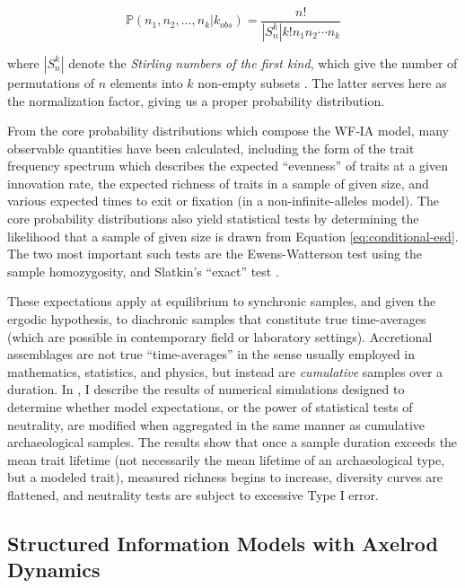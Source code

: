 \begin{equation}
\label{eq:conditional-esd}
\mathbb{P}(n_1, n_2, \ldots, n_k | k_{obs}) = \frac{n!}{|S^k_n| k! n_1 n_2 \cdots n_k}
\end{equation}

where $|S^k_n|$ denote the \emph{Stirling numbers of the first kind}, which give the number of permutations of $n$ elements into $k$ non-empty subsets \citep{abramowitz1965}.  The latter serves here as the normalization factor, giving us a proper probability distribution.   

From the core probability distributions which compose the WF-IA model, many observable quantities have been calculated, including the form of the trait frequency spectrum which describes the expected ``evenness'' of traits at a given innovation rate, the expected richness of traits in a sample of given size, and various expected times to exit or fixation (in a non-infinite-alleles model).  The core probability distributions also yield statistical tests by determining the likelihood that a sample of given size is drawn from Equation \ref{eq:conditional-esd}.  The two most important such tests  are the Ewens-Watterson test using the sample homozygosity, and Slatkin's ``exact'' test \citep{durrett2008,Ewens2004,slatkin1994exact,slatkin1996correction,slatkin1994exact,slatkin1996correction}.  

These expectations apply at equilibrium to synchronic samples, and given the ergodic hypothesis, to diachronic samples that constitute true time-averages (which are possible in contemporary field or laboratory settings).  Accretional assemblages are not true ``time-averages'' in the sense usually employed in mathematics, statistics, and physics, but instead are \emph{cumulative} samples over a duration.  In \citet{Madsen2012TA}, I describe the results of numerical simulations designed to determine whether model expectations, or the power of statistical tests of neutrality, are modified when aggregated in the same manner as cumulative archaeological samples.  The results show that once a sample duration exceeds the mean trait lifetime (not necessarily the mean lifetime of an archaeological type, but a modeled trait), measured richness begins to increase, diversity curves are flattened, and neutrality tests are subject to excessive Type I error.  

\subsection{Structured Information Models with Axelrod Dynamics}
\label{sec:structured-information-models}



